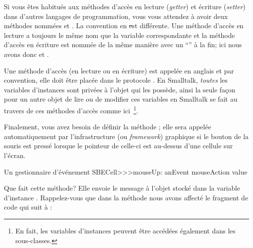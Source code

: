\documentclass[a4paper,10pt,twoside]{book}
\begin{document}
Si vous \^etes habitués aux méthodes d'accès en lecture (\emph{getter})
et écriture (\emph{setter}) dans d'autres langages de programmation,
vous vous attendez à avoir deux méthodes nommées 
et .
La convention en \st est différente.
Une méthode d'accès en lecture a toujours le m\^eme nom que la variable
correspondante et la méthode d'accès en écriture est nommée de la m\^eme
manière avec un ``\ct{:}'' à la fin; ici nous avons donc
 et .

Une méthode d'accès (en lecture ou en écriture) est appelée
en anglais  et par convention, elle doit \^etre
placée dans le protocole .
En Smalltalk, \emph{toutes} les variables d'instances sont privées à
l'objet qui les possède, ainsi la seule façon pour un autre objet de
lire ou de modifier ces variables en Smalltalk se fait au travers de
ces méthodes d'accès comme ici~\footnote{En fait, les variables
  d'instances peuvent \^etre accédées également dans les sous-classes.}.


Finalement, vous avez besoin de définir la méthode ; elle
sera appelée automatiquement par l'infrastructure (ou \emph{framework})
graphique si le bouton de la souris est pressé lorsque le pointeur de
celle-ci est au-dessus d'une cellule sur l'écran.

\begin{method}[sbecellmouseup]{Un gestionnaire d'événement}
SBECell>>>mouseUp: anEvent
   mouseAction value
\end{method}


Que fait cette méthode? Elle envoie le message  à l'objet
stocké dans la variable d'instance . 
Rappelez-vous que dans la méthode 
nous avons affecté le fragment de code qui suit à :
\end{document}
